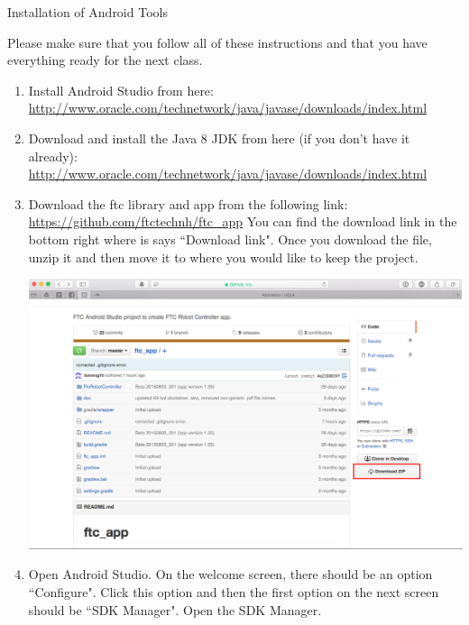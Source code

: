 \documentclass[11pt,fleqn]{article}
\begin{document}
\begin{center}
{\Huge
Installation of Android Tools
}\\
\end{center}

Please make sure that you follow all of these instructions and that you have
everything ready for the next class.

\begin{enumerate}[1.]
\item
Install Android Studio from here: \newline
\url{http://www.oracle.com/technetwork/java/javase/downloads/index.html}
 
\item
    Download and install the Java 8 JDK from here (if you don't have it already):\newline
\url{http://www.oracle.com/technetwork/java/javase/downloads/index.html}

\item
Download the ftc library and app from the following link:\newline
\url{https://github.com/ftctechnh/ftc_app}\newline
You can find the download link in the bottom right where is says ``Download
link". Once you download the file, unzip it and then move it to where you would
like to keep the project. 

\begin{center}
\includegraphics[scale=.3]{Step1}
\end{center}

\item
Open Android Studio. On the welcome screen, there should be an option
``Configure". Click this option and then the first option on the next screen
should be ``SDK Manager". Open the SDK Manager. 


\end{enumerate}
\end{document}
